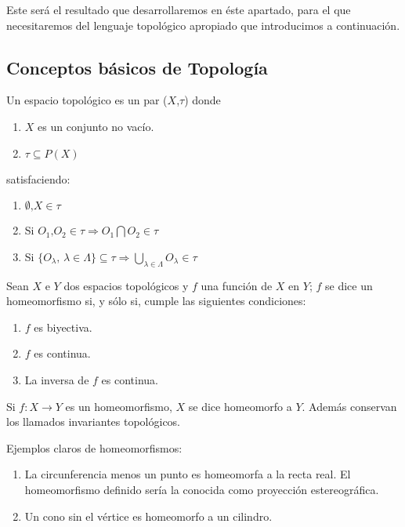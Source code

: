 \documentclass[12pt,a4paper,oldfontcommands]{memoir}
\begin{document}
Este será el resultado que desarrollaremos en éste apartado, para el que necesitaremos del lenguaje topológico apropiado que introducimos a continuación.

\subsection{Conceptos básicos de Topología}

\begin{definition}
	Un espacio topológico es un par ($X$,$\tau$) donde
	\begin{enumerate}
		\item  $X$ es un conjunto no vacío.
		\item $\tau \subseteq \mathit{P}(X)$
	\end{enumerate}
	satisfaciendo:
	\begin{enumerate}
		\item $\emptyset \text{,} X \in \tau$
		\item Si $O_1 \text{,} O_2 \in \tau \Longrightarrow O_1 \bigcap O_2 \in \tau$
		\item Si $\{ O_\lambda \text{, } \lambda \in \Lambda \} \subseteq \tau \Longrightarrow \bigcup_{\lambda \in \Lambda} O_\lambda \in \tau$
	\end{enumerate}
\end{definition}


\begin{definition}
	Sean $X$ e $Y$ dos espacios topológicos y $f$ una función de $X$ en $Y$; $f$ se dice un homeomorfismo si, y sólo si, cumple las siguientes condiciones:
	\begin{enumerate}
		\item $f$ es biyectiva.
		\item $f$ es continua.
		\item La inversa de $f$ es continua.
	\end{enumerate}
\end{definition}

Si $f : X \rightarrow Y$ es un homeomorfismo, $X$ se dice homeomorfo a $Y$. Además conservan los llamados invariantes topológicos.

Ejemplos claros de homeomorfismos:

\begin{enumerate}
	\item La circunferencia menos un punto es homeomorfa a la recta real. El homeomorfismo definido sería la conocida como proyección estereográfica.
	\item Un cono sin el vértice es homeomorfo a un cilindro.
\end{enumerate}
\end{document}
